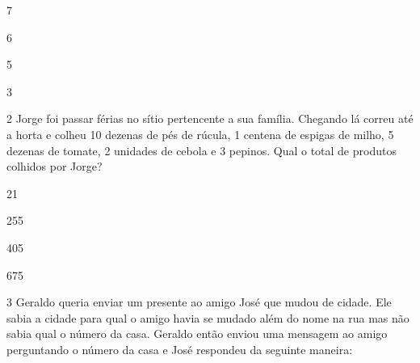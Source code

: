 \begin{escolha}
\item
  7
\item
  6
\item
  5
\item
  3
\end{escolha}


\num{2} Jorge foi passar férias no sítio pertencente a sua família.
Chegando lá correu até a horta e colheu 10 dezenas de pés de rúcula, 1
centena de espigas de milho, 5 dezenas de tomate, 2 unidades de cebola e
3 pepinos. Qual o total de produtos colhidos por Jorge?

\begin{escolha}
\item
  21
\item
  255
\item
  405
\item
  675
\end{escolha}


\num{3} Geraldo queria enviar um presente ao amigo José que mudou de
cidade. Ele sabia a cidade para qual o amigo havia se mudado além do
nome na rua mas não sabia qual o número da casa. Geraldo então enviou
uma mensagem ao amigo perguntando o número da casa e José respondeu da
seguinte maneira:


